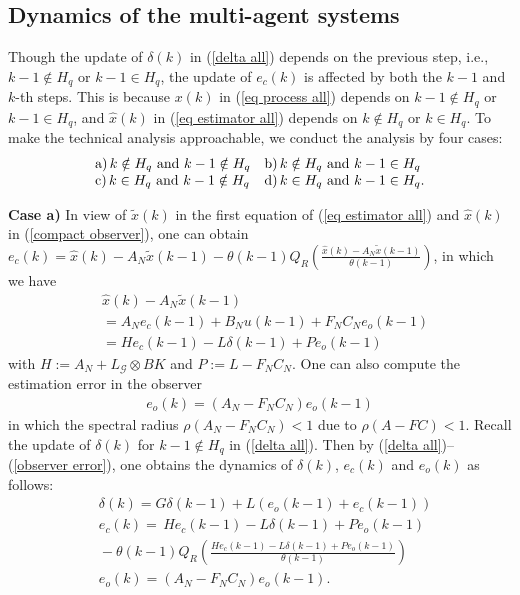 \documentclass[letterpaper,journal,final,twocolumn]{IEEEtran}
\begin{document}
\subsection{Dynamics of the multi-agent systems}
Though the update of $\delta(k)$ in (\ref{delta all}) depends on the previous step, i.e., $k-1  \notin H_q$ or $k-1 \in H_q$, the update of $e_c(k)$ is affected by both the $k-1$ and $k$-th steps. 
This is because $x(k)$ in (\ref{eq process all}) depends on $k-1 \notin H_q $ or $k-1 \in H_q$, and $\hat x(k)$ in (\ref{eq estimator all}) depends on $k \notin H_q $ or $k\in H_q$. To make the technical analysis approachable, we conduct the analysis by four cases:
\begin{align*}
\begin{array}{ll}
	\text{a})\, k \notin H_q$ and $k-1 \notin H_q & \text{b})\, k \notin H_q$ and $k-1 \in H_q \\
\text{c})\,	k \in H_q$ and $k-1 \notin H_q &  \text{d})\, k \in H_q$ and $k-1 \in H_q.
\end{array}
\end{align*}

\textbf{Case a)} In view of $\tilde x(k)$ in the first equation of (\ref{eq estimator all}) and $\hat x(k)$ in (\ref{compact observer}), one can obtain 
$
e_c(k) = \hat x(k) - A_N \tilde x(k-1)  
- \theta(k-1) Q_R \left(\frac{ \hat x(k) - A_N \tilde x(k-1) }{\theta(k-1)}\right)
$,
in which we have
\begin{align}\label{HK}
& \hat x(k) -A_N \tilde x(k-1)    \nonumber\\
&=A_N e_c(k-1) + B_N u(k-1) + F_N C_N e_o(k-1)\nonumber\\
&= H e_c(k-1) - L\delta(k-1) +Pe_o(k-1)
\end{align}
with 
$
H := A_N +  L_ \mathcal{G} \otimes B K 
$ and $P:=L-F_NC_N$.
One can also compute the estimation error in the observer 
\begin{align}\label{observer error}
e_o(k)=(A_N - F_NC_N) e_o(k-1)
\end{align}
in which the spectral radius $\rho(A_N - F_NC_N)<1$ due to $\rho(A - FC)<1$.
Recall the update of $\delta(k)$ for $k-1 \notin H_q$ in (\ref{delta all}). Then by (\ref{delta all})--(\ref{observer error}), one obtains the dynamics of $\delta(k)$, $e_c(k)$ and $e_o(k)$ as follows: 
\begin{subequations}\label{case a}
\begin{align}
&\delta(k) =G \delta(k-1)  + L(e_o(k-1) + e_c(k-1))\\
&e_c(k) 
=\, H e_c(k-1) - L\delta(k-1)+Pe_o(k-1)   \nonumber\\ 
   &\!\!   -\!  \theta(k\!-\!1) Q_R\! \left(\!\!\frac{ H e_c(k-1) \!-\! L\delta(k-1) \!+\! Pe_o(k-1) }{\theta(k-1)} \!\!\right)\label{e no DoS}\\
 &e_o(k)=(A_N - F_NC_N) e_o(k-1). \label{e3 no dos}
\end{align}
\end{subequations}
\end{document}
